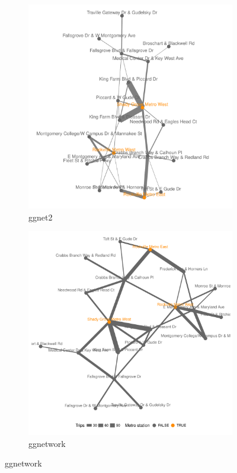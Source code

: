\begin{figure}[hbtp]
\begin{subfigure}[t]{.49\textwidth}
\end{subfigure}
\begin{subfigure}[t]{.49\textwidth}
\caption{ggnet2}
\includegraphics[width=\textwidth]{figure/bikes_ggnet2-1.pdf}
\end{subfigure}
\begin{subfigure}[t]{.49\textwidth}
\caption{ggnetwork}
\includegraphics[width=\textwidth]{figure/bikes_ggnetwork-1.pdf}
\end{subfigure}


\end{figure}

